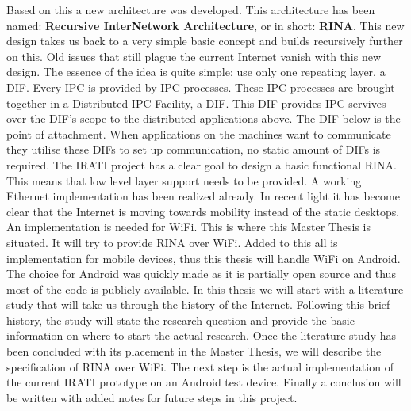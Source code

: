 Based on this a new architecture was developed. This architecture has been named: \textbf{Recursive InterNetwork Architecture}, or in short: \textbf{RINA}. This new design takes us back to a very simple basic concept and builds recursively further on this. Old issues that still plague the current Internet vanish with this new design. The essence of the idea is quite simple: use only one repeating layer, a DIF. Every IPC is provided by IPC processes. These IPC processes are brought together in a Distributed IPC Facility, a DIF. This DIF provides IPC servives over the DIF's scope to the distributed applications above. The DIF below is the point of attachment. When applications on the machines want to communicate they utilise these DIFs to set up communication, no static amount of DIFs is required.
\npar
The IRATI project has a clear goal to design a basic functional RINA. This means that low level layer support needs to be provided. A working Ethernet implementation has been realized already. In recent light it has become clear that the Internet is moving towards mobility instead of the static desktops. An implementation is needed for WiFi. This is where this Master Thesis is situated. It will try to provide RINA over WiFi. Added to this all is implementation for mobile devices, thus this thesis will handle WiFi on Android. The choice for Android was quickly made as it is partially open source and thus most of the code is publicly available.
\npar
In this thesis we will start with a literature study that will take us through the history of the Internet. Following this brief history, the study will state the research question and provide the basic information on where to start the actual research. Once the literature study has been concluded with its placement in the Master Thesis, we will describe the specification of RINA over WiFi. The next step is the actual implementation of the current IRATI prototype on an Android test device. Finally a conclusion will be written with added notes for future steps in this project.